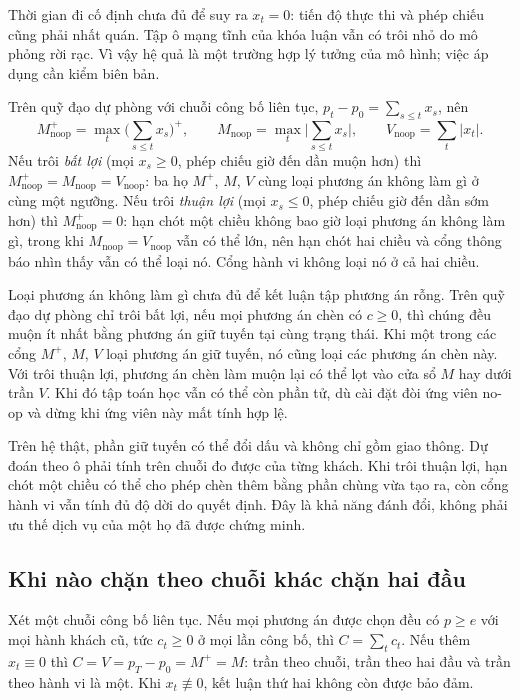 Thời gian đi cố định chưa đủ để suy ra $x_t=0$: tiến độ thực thi và phép chiếu cũng phải
nhất quán. Tập ô mạng tĩnh của khóa luận vẫn có trôi nhỏ do mô phỏng rời rạc. Vì vậy hệ quả
là một trường hợp lý tưởng của mô hình; việc áp dụng cần kiểm biên bản.

\begin{hequa}
\label{hq:chieutroi}
Trên quỹ đạo dự phòng với chuỗi công bố liên tục, $p_t - p_0 = \sum_{s \le t} x_s$, nên
\[
M^{+}_{\text{noop}} = \max_t \Big(\sum_{s \le t} x_s\Big)^{+}, \qquad
M_{\text{noop}} = \max_t \Big|\sum_{s \le t} x_s\Big|, \qquad
V_{\text{noop}} = \sum_t |x_t| .
\]
Nếu trôi \emph{bất lợi} (mọi $x_s\ge0$, phép chiếu giờ đến dần muộn hơn) thì
$M^{+}_{\text{noop}} = M_{\text{noop}} = V_{\text{noop}}$: ba họ $M^{+}$, $M$, $V$ cùng loại phương
án không làm gì ở cùng một ngưỡng. Nếu trôi \emph{thuận lợi} (mọi $x_s\le0$, phép chiếu
giờ đến dần sớm hơn) thì
$M^{+}_{\text{noop}} = 0$: hạn chót một chiều không bao giờ loại phương án không làm gì, trong khi
$M_{\text{noop}} = V_{\text{noop}}$ vẫn có thể lớn, nên hạn chót hai chiều và cổng thông báo nhìn thấy vẫn có
thể loại nó. Cổng hành vi không loại nó ở cả hai chiều.
\end{hequa}

Loại phương án không làm gì chưa đủ để kết luận tập phương án rỗng. Trên quỹ đạo dự phòng
chỉ trôi bất lợi, nếu mọi phương án chèn có $c\ge0$, thì chúng đều muộn ít nhất bằng
phương án giữ tuyến tại cùng trạng thái. Khi một trong các cổng $M^{+}$, $M$, $V$ loại
phương án giữ tuyến, nó cũng loại các phương án chèn này. Với trôi thuận lợi, phương án
chèn làm muộn lại có thể lọt vào cửa sổ $M$ hay dưới trần $V$. Khi đó tập toán học vẫn có
thể còn phần tử, dù cài đặt đòi ứng viên no-op và dừng khi ứng viên này mất tính hợp lệ.

Trên hệ thật, phần giữ tuyến có thể đổi dấu và không chỉ gồm giao thông. Dự đoán theo ô
phải tính trên chuỗi đo được của từng khách. Khi trôi thuận lợi, hạn chót một chiều có thể
cho phép chèn thêm bằng phần chùng vừa tạo ra, còn cổng hành vi vẫn tính đủ độ dời do quyết
định. Đây là khả năng đánh đổi, không phải ưu thế dịch vụ của một họ đã được chứng minh.

\subsection{Khi nào chặn theo chuỗi khác chặn hai đầu}


\begin{menhde}

Xét một chuỗi công bố liên tục. Nếu mọi phương án được chọn đều có $p \ge e$ với mọi hành khách
cũ, tức $c_t \ge 0$ ở mọi lần công bố, thì $C = \sum_t c_t$. Nếu thêm $x_t \equiv 0$ thì
$C = V = p_T - p_0 = M^{+} = M$: trần theo chuỗi, trần theo hai đầu và trần theo hành vi là một.
Khi $x_t \not\equiv 0$, kết luận thứ hai không còn được bảo đảm.
\end{menhde}

